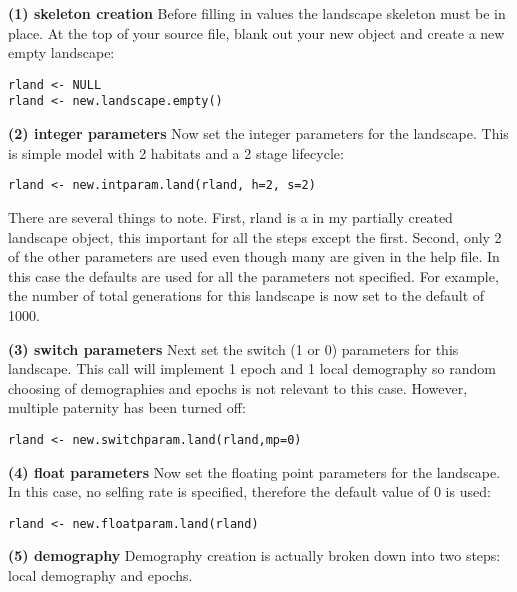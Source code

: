 \documentclass{article}
\begin{document}
\begin{list}{}{\setlength{\labelsep}{10pt} \setlength{\leftmargin}{40pt}}

\item[\textbf{(1) skeleton creation}]
Before filling in values the landscape skeleton must be in place.  At the top of your source file, blank out your new object and create a new empty landscape:
\begin{verbatim}
rland <- NULL
rland <- new.landscape.empty()
\end{verbatim}

\item[\textbf{(2) integer parameters}]
Now set the integer parameters for the landscape.  This is simple model with 2 habitats and a 2 stage lifecycle:
\begin{verbatim}
rland <- new.intparam.land(rland, h=2, s=2)
\end{verbatim}
There are several things to note.  First, rland is a in my partially created landscape object, this important for all the steps except the first.  Second, only 2 of the other parameters are used even though many are given in the help file.  In this case the defaults are used for all the parameters not specified.  For example, the number of total generations for this landscape is now set to the default of 1000.

\item[\textbf{(3) switch parameters}]
Next set the switch (1 or 0) parameters for this landscape. This call will implement 1 epoch and 1 local demography so random choosing of demographies and epochs is not relevant to this case.  However, multiple paternity has been turned off:
\begin{verbatim}
rland <- new.switchparam.land(rland,mp=0)
\end{verbatim}

\item[\textbf{(4) float parameters}]
Now set the floating point parameters for the landscape.  In this case, no selfing rate is specified, therefore the default value of 0 is used:
\begin{verbatim}
rland <- new.floatparam.land(rland)
\end{verbatim}

\item[\textbf{(5) demography}]
Demography creation is actually broken down into two steps: local demography and epochs.


\end{list}
\end{document}
